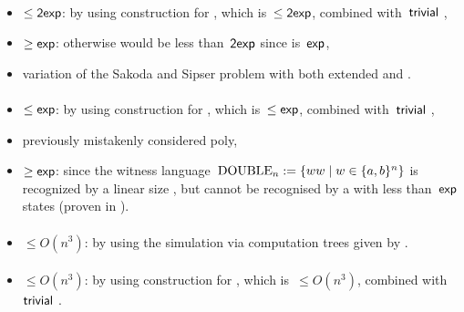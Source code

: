 \paragraph{\OMOLA{}\tto\OMODLA}
\begin{itemize}
	\item $\le\mathsf{2exp}$: by using construction for \hyperref[cost:OM1LAto1DFA]{\OMOLA{}\tto\ODFA}, which is~$\le\mathsf{2exp}$, combined with~$\mathsf{trivial}$ \ODFA{}\tto\OMODLA,
	\item $\ge\mathsf{exp}$: otherwise \hyperref[cost:OM1LAto1DFA]{\OMOLA{}\tto\ODFA} would be less than~$\mathsf{2exp}$ since \hyperref[cost:OM1DLAto1DFA]{\OMODLA{}\tto\ODFA} is~$\mathsf{exp}$,
	\item variation of the Sakoda and Sipser problem with both extended \TNFA and \TDFA.
\end{itemize}
\paragraph{\OMODLA{}\tto\ONFA}
\begin{itemize}
	\item $\le\mathsf{exp}$: by using construction for \hyperref[cost:OM1DLAto1DFA]{\OMODLA{}\tto\ODFA}, which is~$\le\mathsf{exp}$, combined with~$\mathsf{trivial}$ \ODFA{}\tto\ONFA,
	\item previously mistakenly considered poly,
	\item $\ge\mathsf{exp}$: since the witness language~$\mathrm{DOUBLE}_n:=\{ww\mid w\in\{a,b\}^n\}$ is recognized by a linear size \OMODLA, but cannot be recognised by a \ONFA with less than~$\mathsf{exp}$ states (proven in ).
\end{itemize}
\paragraph{\OMODLA{}\tto\TDFA}\label{cost:OM1DLAto2DFA}
\begin{itemize}
	\item $\le O(n^3)$: by using the simulation via computation trees given by .
\end{itemize}
\paragraph{\OMODLA{}\tto\TNFA}
\begin{itemize}
	\item $\le O(n^3)$: by using construction for \hyperref[cost:OM1DLAto2DFA]{\OMODLA{}\tto\TDFA}, which is~$\le O(n^3)$, combined with~$\mathsf{trivial}$ \TDFA{}\tto\TNFA.
\end{itemize}



